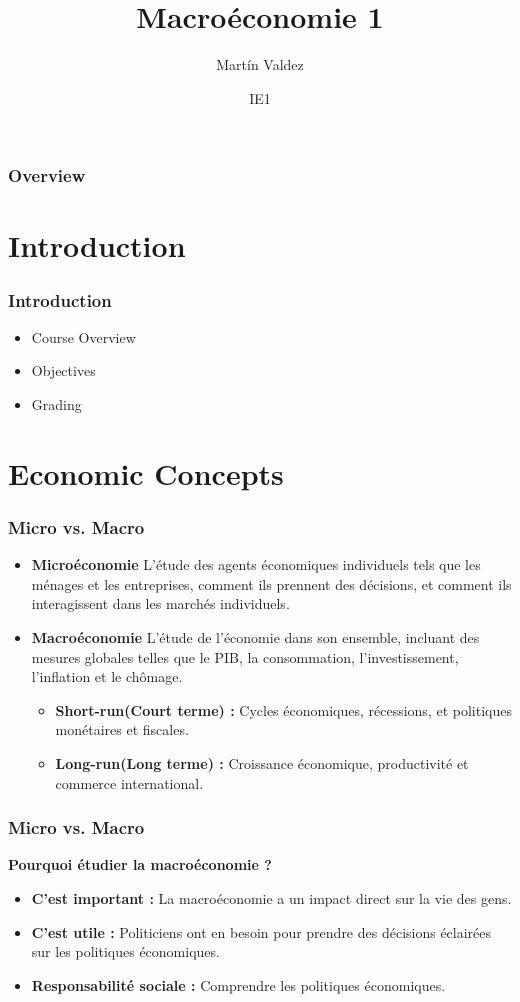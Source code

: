\documentclass{beamer}
\title{Macroéconomie 1}
\author{Mart\'in Valdez}
\date{IE1}
\begin{document}
\begin{frame}
\titlepage
\end{frame}

\begin{frame}
\frametitle{Overview}
\tableofcontents
\end{frame}

\section{Introduction}
\begin{frame}
\frametitle{Introduction}
\begin{itemize}
    \item Course Overview
    \item Objectives
    \item Grading
\end{itemize}
\end{frame}

\section{Economic Concepts}
\begin{frame}
\frametitle{Micro vs. Macro}
\begin{itemize}
    \item \textbf{Microéconomie}
    L'étude des agents économiques individuels tels que les ménages et les entreprises,
    comment ils prennent des décisions, et comment ils interagissent dans les marchés individuels.
    \pause
    \item \textbf{Macroéconomie}
    L'étude de l'économie dans son ensemble, incluant des mesures globales telles que
    le PIB, la consommation, l'investissement, l'inflation et le chômage.
    \begin{itemize}
        \item \textbf{Short-run(Court terme) :} Cycles économiques, récessions, et politiques monétaires et fiscales.\pause
        \item \textbf{Long-run(Long terme) :} Croissance économique, productivité et commerce international.
    \end{itemize}
\end{itemize}
\end{frame}

\begin{frame}
    \frametitle{Micro vs. Macro}
    \textbf{Pourquoi étudier la macroéconomie ?}
    \begin{itemize}\pause
        \item \textbf{C'est important :} 
        La macroéconomie a un impact direct sur la vie des gens.\pause
        \item \textbf{C'est utile :} Politiciens ont en besoin pour 
        prendre des décisions éclairées sur les politiques économiques.\pause
        \item \textbf{Responsabilité sociale :} Comprendre les politiques économiques.
    \end{itemize}
    \end{frame}
    
\end{document}

